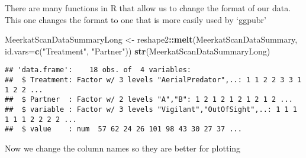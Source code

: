 \documentclass[]{book}
\newenvironment{Shaded}{\begin{snugshade}}{\end{snugshade}}
\newcommand{\CharTok}[1]{\textcolor[rgb]{0.31,0.60,0.02}{#1}}
\newcommand{\DataTypeTok}[1]{\textcolor[rgb]{0.13,0.29,0.53}{#1}}
\newcommand{\KeywordTok}[1]{\textcolor[rgb]{0.13,0.29,0.53}{\textbf{#1}}}
\newcommand{\NormalTok}[1]{#1}
\newcommand{\OperatorTok}[1]{\textcolor[rgb]{0.81,0.36,0.00}{\textbf{#1}}}
\newcommand{\StringTok}[1]{\textcolor[rgb]{0.31,0.60,0.02}{#1}}
\begin{document}
There are many functions in R that allow us to change the format of our data. This one changes the format to one that is more easily used by `ggpubr'

\begin{Shaded}
\begin{Highlighting}[]
\NormalTok{MeerkatScanDataSummaryLong <-}\StringTok{ }\NormalTok{reshape2}\OperatorTok{::}\KeywordTok{melt}\NormalTok{(MeerkatScanDataSummary, }\DataTypeTok{id.vars=}\KeywordTok{c}\NormalTok{(}\StringTok{"Treatment"}\NormalTok{, }\StringTok{"Partner"}\NormalTok{))}
\KeywordTok{str}\NormalTok{(MeerkatScanDataSummaryLong)}
\end{Highlighting}
\end{Shaded}

\begin{verbatim}
## 'data.frame':    18 obs. of  4 variables:
##  $ Treatment: Factor w/ 3 levels "AerialPredator",..: 1 1 2 2 3 3 1 1 2 2 ...
##  $ Partner  : Factor w/ 2 levels "A","B": 1 2 1 2 1 2 1 2 1 2 ...
##  $ variable : Factor w/ 3 levels "Vigilant","OutOfSight",..: 1 1 1 1 1 1 2 2 2 2 ...
##  $ value    : num  57 62 24 26 101 98 43 30 27 37 ...
\end{verbatim}

Now we change the column names so they are better for plotting

\begin{Shaded}
\end{Shaded}
\end{document}
